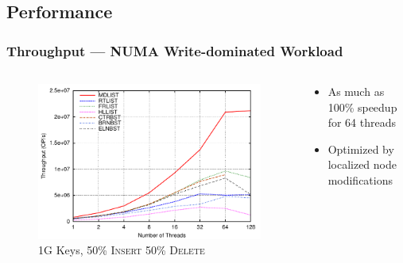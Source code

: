 \documentclass{beamer}
\begin{document}
\subsection{Performance}
\begin{frame} \frametitle{Throughput --- NUMA Write-dominated Workload}
    \begin{columns}
        \begin{column}{8cm}
            \begin{figure}[t]
                \centering
                \includegraphics[width=1\columnwidth]{amd50ins1Bkey.pdf}
                \caption{1G Keys, 50\% \textsc{Insert} 50\% \textsc{Delete}}
                \end{figure}
            \end{column}
            \begin{column}{4.3cm}
                \begin{itemize}
                    \item As much as 100\% speedup for 64 threads
                    \item Optimized by localized node modifications
                \end{itemize}
            \end{column}
        \end{columns}
\end{frame}
\end{document}
